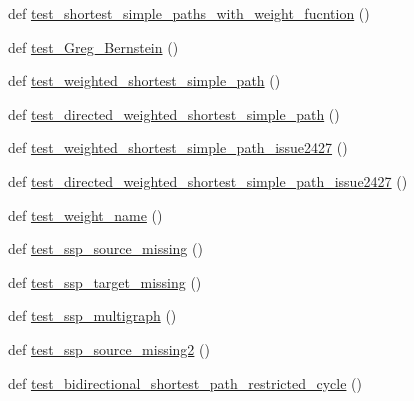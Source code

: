 \begin{DoxyCompactItemize}
\item 
def \hyperlink{namespacenetworkx_1_1algorithms_1_1tests_1_1test__simple__paths_a31dbda2bd22aab36cc0edcb58fafaa2a}{test\+\_\+shortest\+\_\+simple\+\_\+paths\+\_\+with\+\_\+weight\+\_\+fucntion} ()
\item 
def \hyperlink{namespacenetworkx_1_1algorithms_1_1tests_1_1test__simple__paths_a34f71d646761bde6c260cf5326e091f8}{test\+\_\+\+Greg\+\_\+\+Bernstein} ()
\item 
def \hyperlink{namespacenetworkx_1_1algorithms_1_1tests_1_1test__simple__paths_ac5f34b3a332b779892a0d4e930ebafa7}{test\+\_\+weighted\+\_\+shortest\+\_\+simple\+\_\+path} ()
\item 
def \hyperlink{namespacenetworkx_1_1algorithms_1_1tests_1_1test__simple__paths_ab7d398f8977b770d61a8ae749880aefb}{test\+\_\+directed\+\_\+weighted\+\_\+shortest\+\_\+simple\+\_\+path} ()
\item 
def \hyperlink{namespacenetworkx_1_1algorithms_1_1tests_1_1test__simple__paths_aff6cdd1fe80bd8a25e34818dbb011ba7}{test\+\_\+weighted\+\_\+shortest\+\_\+simple\+\_\+path\+\_\+issue2427} ()
\item 
def \hyperlink{namespacenetworkx_1_1algorithms_1_1tests_1_1test__simple__paths_a0588a7c6186b253877b4a1898ca9d5a9}{test\+\_\+directed\+\_\+weighted\+\_\+shortest\+\_\+simple\+\_\+path\+\_\+issue2427} ()
\item 
def \hyperlink{namespacenetworkx_1_1algorithms_1_1tests_1_1test__simple__paths_ad74498339144839e435a2b3aa3666f5a}{test\+\_\+weight\+\_\+name} ()
\item 
def \hyperlink{namespacenetworkx_1_1algorithms_1_1tests_1_1test__simple__paths_ac13909029a86153c385901f75eb6b46f}{test\+\_\+ssp\+\_\+source\+\_\+missing} ()
\item 
def \hyperlink{namespacenetworkx_1_1algorithms_1_1tests_1_1test__simple__paths_afdc66d9bb2398fd9b5aed311243e929c}{test\+\_\+ssp\+\_\+target\+\_\+missing} ()
\item 
def \hyperlink{namespacenetworkx_1_1algorithms_1_1tests_1_1test__simple__paths_ab517871089588f98e9b31b34e4ff4aaa}{test\+\_\+ssp\+\_\+multigraph} ()
\item 
def \hyperlink{namespacenetworkx_1_1algorithms_1_1tests_1_1test__simple__paths_ad7f79c3227f008755a6fb697b7f3c95a}{test\+\_\+ssp\+\_\+source\+\_\+missing2} ()
\item 
def \hyperlink{namespacenetworkx_1_1algorithms_1_1tests_1_1test__simple__paths_a40149355acbebabf7866134579899bc8}{test\+\_\+bidirectional\+\_\+shortest\+\_\+path\+\_\+restricted\+\_\+cycle} ()

\end{DoxyCompactItemize}
